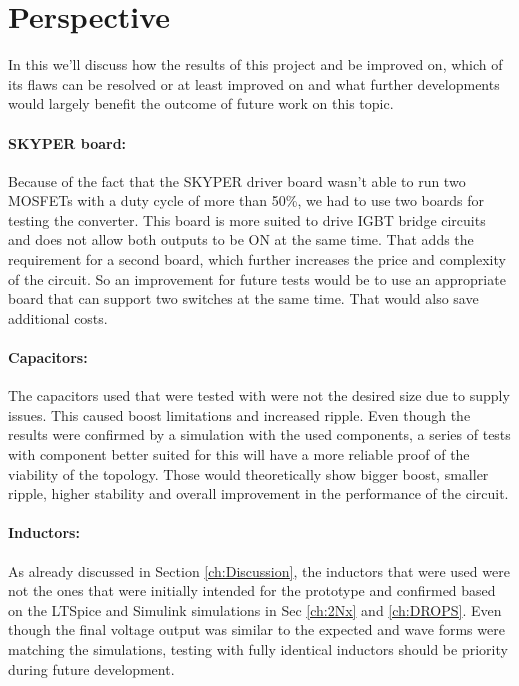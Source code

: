 \chapter{Perspective}\label{ch:perspective}

In this we'll discuss how the results of this project and be improved on, which of its flaws can be resolved or at least improved on and what further developments would largely benefit the outcome of future work on this topic. 

\subsubsection{SKYPER board:}
Because of the fact that the SKYPER driver board wasn't able to run two MOSFETs with a duty cycle of more than 50\%, we had to use two boards for testing the converter. This board is more suited to drive IGBT bridge circuits and does not allow both outputs to be ON at the same time. That adds the requirement for a second board, which further increases the price and complexity of the circuit.
So an improvement for future tests would be to use an appropriate board that can support two switches at the same time. That would also save additional costs.

\subsubsection{Capacitors:}
The capacitors used that were tested with were not the desired size due to supply issues. This caused boost limitations and increased ripple.
Even though the results were confirmed by a simulation with the used components, a series of tests with component better suited for this will have a more reliable proof of the viability of the topology. Those would theoretically show bigger boost, smaller ripple, higher stability and overall improvement in the performance of the circuit.

\subsubsection{Inductors:}
As already discussed in Section \ref{ch:Discussion}, the inductors that were used
were not the ones that were initially intended for the prototype and confirmed based on the LTSpice and Simulink simulations in Sec \ref{ch:2Nx} and \ref{ch:DROPS}. Even though the final voltage output was similar to the expected and wave forms were matching the simulations, testing with fully identical inductors should be priority during future development. 

